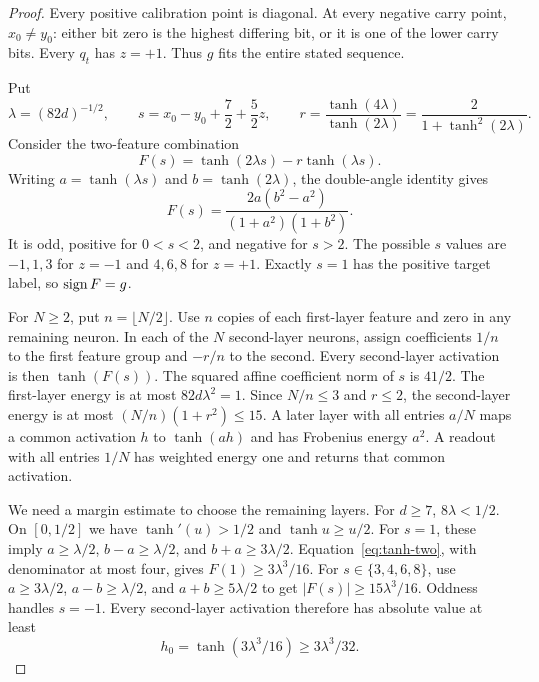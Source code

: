 \begin{proof}
Every positive calibration point is diagonal. At every negative carry
point, $x_0\ne y_0$: either bit zero is the highest differing bit, or
it is one of the lower carry bits. Every $q_t$ has $z=+1$.
Thus $g$ fits the entire stated sequence.

Put
\[
 \lambda=(82d)^{-1/2},\qquad
 s=x_0-y_0+\frac72+\frac52z,\qquad
 r=\frac{\tanh(4\lambda)}{\tanh(2\lambda)}
   =\frac2{1+\tanh^2(2\lambda)}.
\]
Consider the two-feature combination
\[
 F(s)=\tanh(2\lambda s)-r\tanh(\lambda s).
\]
Writing $a=\tanh(\lambda s)$ and $b=\tanh(2\lambda)$, the double-angle
identity gives
\begin{equation}\label{eq:tanh-two}
 F(s)=\frac{2a(b^2-a^2)}{(1+a^2)(1+b^2)}.
\end{equation}
It is odd, positive for $0<s<2$, and negative for $s>2$.
The possible $s$ values are $-1,1,3$ for $z=-1$ and $4,6,8$ for
$z=+1$. Exactly $s=1$ has the positive target label, so $\operatorname{sign} F=g$.

For $N\ge2$, put $n=\lfloor N/2\rfloor$. Use $n$ copies of each
first-layer feature and zero in any remaining neuron. In each of the
$N$ second-layer neurons, assign coefficients $1/n$ to the first
feature group and $-r/n$ to the second. Every second-layer activation
is then $\tanh(F(s))$.
The squared affine coefficient norm of $s$ is $41/2$.
The first-layer energy is at most $82d\lambda^2=1$.
Since $N/n\le3$ and $r\le2$, the second-layer energy is at most
$(N/n)(1+r^2)\le15$.
A later layer with all entries $a/N$ maps a common activation $h$ to
$\tanh(ah)$ and has Frobenius energy $a^2$. A readout with all entries
$1/N$ has weighted energy one and returns that common activation.

We need a margin estimate to choose the remaining layers.
For $d\ge7$, $8\lambda<1/2$. On $[0,1/2]$ we have
$\tanh'(u)>1/2$ and $\tanh u\ge u/2$.
For $s=1$, these imply $a\ge\lambda/2$,
$b-a\ge\lambda/2$, and $b+a\ge3\lambda/2$.
Equation~\eqref{eq:tanh-two}, with denominator at most four, gives
$F(1)\ge3\lambda^3/16$. For $s\in\{3,4,6,8\}$, use
$a\ge3\lambda/2$, $a-b\ge\lambda/2$, and $a+b\ge5\lambda/2$
to get $|F(s)|\ge15\lambda^3/16$. Oddness handles $s=-1$.
Every second-layer activation therefore has absolute value at least
\[
 h_0=\tanh(3\lambda^3/16)\ge3\lambda^3/32.
\]


\end{proof}
